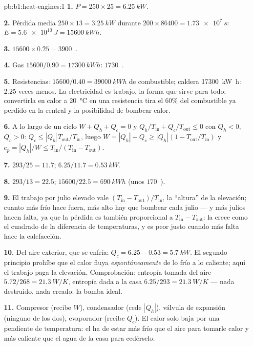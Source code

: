 \begin{solution}{pb:b1:heat-engines:1}
\textbf{1.} $P = 250 \times 25 = \qty{6.25}{kW}$.

\textbf{2.} Pérdida media $250 \times 13 = \qty{3.25}{kW}$ durante $200 \times 86400 =
\qty{1.73e7}{s}$: $E = \qty{5.6e10}{J} = \qty{15600}{kW h}$.

\textbf{3.} $15600 \times 0.25 = 3900$~\texteuro.

\textbf{4.} Gas $15600/0.90 = \qty{17300}{kW h}$: $1730$~\texteuro.

\textbf{5.} Resistencias: $15600/0.40 = \qty{39000}{kW h}$ de combustible; caldera
\qty{17300}{kW h}: $2.25$ veces menos. La electricidad es trabajo, la forma
que sirve para todo; convertirla en calor a \qty{20}{\degreeCelsius} en una
resistencia tira el $60\%$ del combustible ya perdido en la central y la
posibilidad de bombear calor.

\textbf{6.} A lo largo de un ciclo $W + Q_h + Q_c = 0$ y $Q_h/T_{\mathrm{in}} +
Q_c/T_{\mathrm{out}} \leq 0$ con $Q_h < 0$, $Q_c > 0$: $Q_c \leq
|Q_h|T_{\mathrm{out}}/T_{\mathrm{in}}$, luego $W = |Q_h| - Q_c \geq |Q_h|(1 -
T_{\mathrm{out}}/T_{\mathrm{in}})$ y $e_p = |Q_h|/W \leq T_{\mathrm{in}}/(T_{\mathrm{in}} -
T_{\mathrm{out}})$.

\textbf{7.} $293/25 = 11.7$; $6.25/11.7 = \qty{0.53}{kW}$.

\textbf{8.} $293/13 = 22.5$; $15600/22.5 = \qty{690}{kW h}$ (unos
$170$~\texteuro).

\textbf{9.} El trabajo por julio elevado vale $(T_{\mathrm{in}} - T_{\mathrm{out}})/
T_{\mathrm{in}}$, la ``altura'' de la elevación; cuanto más frío hace fuera,
más alto hay que bombear cada julio --- y más julios hacen falta, ya que
la pérdida es también proporcional a $T_{\mathrm{in}} - T_{\mathrm{out}}$: la
 crece como el cuadrado de la diferencia de temperaturas,
y es peor justo cuando más falta hace la calefacción.

\textbf{10.} Del aire exterior, que se enfría: $Q_c = 6.25 - 0.53 =
\qty{5.7}{kW}$. El segundo principio prohíbe que el calor fluya
\emph{espontáneamente} de lo frío a lo caliente; aquí el trabajo paga la
elevación. Comprobación: entropía tomada del aire $5.72/268 = \qty{21.3}{W/K}$, entropía
dada a la casa $6.25/293 =
\qty{21.3}{W/K}$ --- nada destruido, nada creado: la bomba ideal.

\textbf{11.} Compresor (recibe $W$), condensador (cede $|Q_h|$), válvula de
expansión (ninguno de los dos), evaporador (recibe $Q_c$). El calor solo
baja por una pendiente de temperatura: el  ha de estar más
frío que el aire para tomarle calor y más caliente que el agua de la casa para cedérselo.


\end{solution}
